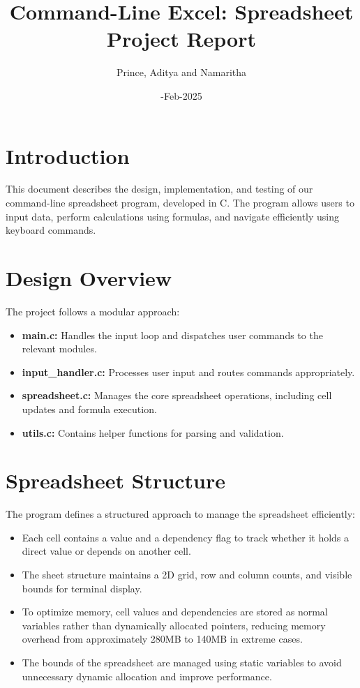 \documentclass{article}
\title{Command-Line Excel: Spreadsheet Project Report}
\author{Prince, Aditya and Namaritha}
\date{\01-Feb-2025}
\begin{document}
\maketitle

\section{Introduction}
This document describes the design, implementation, and testing of our command-line spreadsheet program, developed in C. The program allows users to input data, perform calculations using formulas, and navigate efficiently using keyboard commands.

\section{Design Overview}
The project follows a modular approach:
\begin{itemize}
    \item \textbf{main.c:} Handles the input loop and dispatches user commands to the relevant modules.
    \item \textbf{input\_handler.c:} Processes user input and routes commands appropriately.
    \item \textbf{spreadsheet.c:} Manages the core spreadsheet operations, including cell updates and formula execution.
    \item \textbf{utils.c:} Contains helper functions for parsing and validation.
\end{itemize}

\section{Spreadsheet Structure}
The program defines a structured approach to manage the spreadsheet efficiently:
\begin{itemize}
    \item Each cell contains a value and a dependency flag to track whether it holds a direct value or depends on another cell.
    \item The sheet structure maintains a 2D grid, row and column counts, and visible bounds for terminal display.
    \item To optimize memory, cell values and dependencies are stored as normal variables rather than dynamically allocated pointers, reducing memory overhead from approximately 280MB to 140MB in extreme cases.
    \item The bounds of the spreadsheet are managed using static variables to avoid unnecessary dynamic allocation and improve performance.
\end{itemize}
\end{document}
